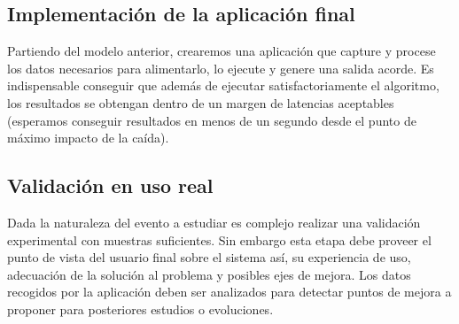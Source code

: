 \subsection{Implementación de la aplicación final}
Partiendo del modelo anterior, crearemos una aplicación que capture y procese los datos necesarios para alimentarlo, lo ejecute y genere una salida acorde. Es indispensable conseguir que además de ejecutar satisfactoriamente el algoritmo, los resultados se obtengan dentro de un margen de latencias aceptables (esperamos conseguir resultados en menos de un segundo desde el punto de máximo impacto de la caída).

\subsection{Validación en uso real}
Dada la naturaleza del evento a estudiar es complejo realizar una validación experimental con muestras suficientes. Sin embargo esta etapa debe proveer el punto de vista del usuario final sobre el sistema así, su experiencia de uso, adecuación de la solución al problema y posibles ejes de mejora. Los datos recogidos por la aplicación deben ser analizados para detectar puntos de mejora a proponer para posteriores estudios o evoluciones.

% 
